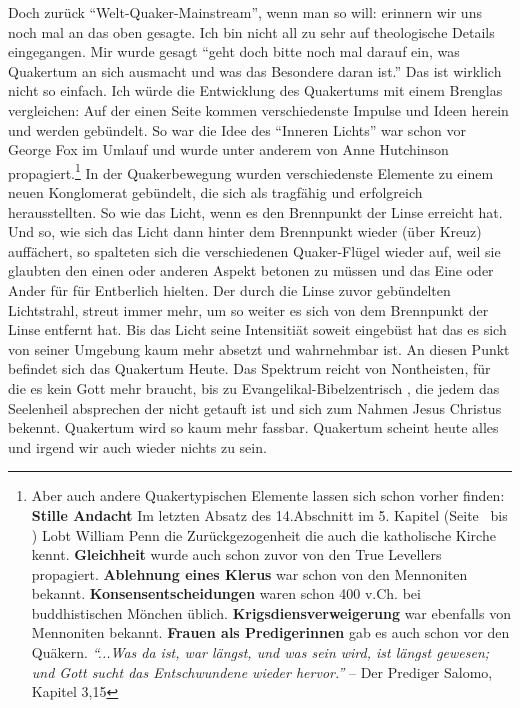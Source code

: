 Doch zurück "`Welt-Quaker-Mainstream"', wenn man so will: erinnern wir uns noch mal
an das oben gesagte. Ich bin nicht all zu sehr auf theologische Details
eingegangen. Mir wurde gesagt "`geht doch bitte noch mal darauf ein, was
Quakertum an sich ausmacht und was das Besondere daran ist."' Das ist wirklich
nicht so einfach. Ich würde die Entwicklung des Quakertums mit einem Brenglas
vergleichen: Auf der einen Seite kommen verschiedenste Impulse und Ideen herein
und werden gebündelt. So war die Idee des "`Inneren Lichts"' war schon vor
George Fox im Umlauf und wurde unter anderem von Anne Hutchinson propagiert.\footnote{Aber auch andere Quakertypischen Elemente lassen sich schon vorher finden:
\textbf{Stille Andacht} Im letzten Absatz des 14.Abschnitt im 5. Kapitel (Seite~\pageref{kap5_ab14} bis \pageref{ref:05_13_zurueckgezogenheit_ende}) Lobt William Penn die Zurückgezogenheit die auch die katholische Kirche kennt.
\textbf{Gleichheit} wurde auch schon zuvor von den True Levellers propagiert.
\textbf{Ablehnung eines Klerus} war schon von den Mennoniten bekannt.
\textbf{Konsensentscheidungen} waren schon 400 v.Ch. bei buddhistischen Mönchen üblich.
\textbf{Krigsdiensverweigerung} war ebenfalls von Mennoniten bekannt.
\textbf{Frauen als Predigerinnen} gab es auch schon vor den Quäkern.
\textit{"`...Was da ist, war längst, und was sein wird, ist längst gewesen; und Gott sucht das Entschwundene wieder hervor."'} -- Der Prediger Salomo, Kapitel 3,15
} In der
Quakerbewegung wurden verschiedenste Elemente zu einem neuen Konglomerat
gebündelt, die sich als tragfähig und erfolgreich herausstellten.
So wie das Licht, wenn
es den Brennpunkt der Linse erreicht hat. Und so, wie sich das Licht dann hinter dem Brennpunkt wieder (über Kreuz) auffächert, so spalteten sich die verschiedenen Quaker-Flügel wieder auf, weil sie glaubten den einen oder anderen Aspekt betonen zu müssen und das Eine oder Ander für für Entberlich hielten. Der durch die Linse zuvor gebündelten
Lichtstrahl, streut immer mehr, um so weiter es sich von dem
Brennpunkt der Linse entfernt hat. Bis das Licht seine Intensitiät soweit eingebüst hat das es sich von seiner Umgebung kaum mehr absetzt und wahrnehmbar ist. An diesen
Punkt befindet sich das Quakertum Heute. Das Spektrum reicht von Nontheisten, für die
es kein Gott mehr braucht, bis zu Evangelikal-Bibelzentrisch , die jedem das
Seelenheil absprechen der nicht getauft ist und sich zum Nahmen Jesus Christus
bekennt. Quakertum wird so kaum mehr fassbar. Quakertum scheint heute alles und irgend wir auch wieder nichts zu sein.

